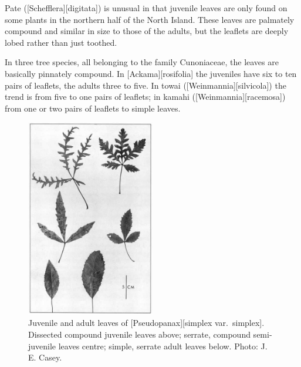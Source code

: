 Pate ([Schefflera][digitata]) is unusual in that juvenile leaves are only found on some plants in the northern half of the North Island.
These leaves are palmately compound and similar in size to those of the adults, but the leaflets are deeply lobed rather than just toothed.

In three tree species, all belonging to the family Cunoniaceae, the leaves are basically pinnately compound.
In [Ackama][rosifolia] the juveniles have six to ten pairs of leaflets, the adults three to five.
In towai ([Weinmannia][silvicola]) the trend is from five to one pairs of leaflets; in kamahi ([Weinmannia][racemosa]) from one or two pairs of leaflets to simple leaves.

\begin{figure}
	\includegraphics[width=0.5\textwidth]{graphics/figure18pseudopanax.jpg}
	\centering
	\caption[Juvenile and adult leaves of \emph{Pseudopanax simplex var.\ simplex}]{Juvenile and adult leaves of [Pseudopanax][simplex var.\ simplex].
Dissected compound juvenile leaves above; serrate, compound semi-juvenile leaves centre; simple, serrate adult leaves below.
	Photo: J. E. Casey.}%
	\label{fig:18pseudopanax}
\end{figure}

